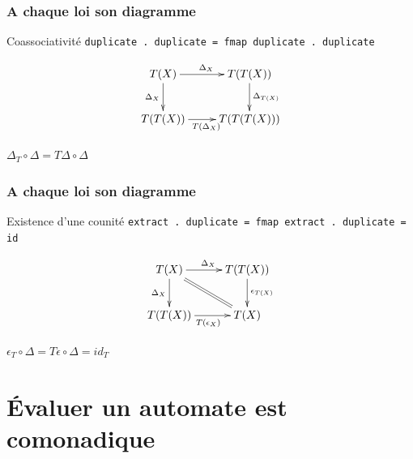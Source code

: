 \documentclass{beamer}
\begin{document}
\begin{frame}
\frametitle{A chaque loi son diagramme}
\begin{alertblock}{Coassociativité}
\verb!duplicate . duplicate = fmap duplicate . duplicate!
\end{alertblock}

\begin{block}{}

\[
\xymatrix{
T(X) \ar[r]^{\Delta_X} \ar[d]_{\Delta_X} & T(T(X)) \ar[d]^{\Delta_{T(X)}} \\
T(T(X)) \ar[r]_{T(\Delta_X)} & T(T(T(X))) \\
}
\]
\end{block}

\begin{block}{}
\begin{center}
$\Delta_T \circ \Delta = T\Delta \circ \Delta$
\end{center}
\end{block}

\end{frame}

\begin{frame}
\frametitle{A chaque loi son diagramme}
\begin{alertblock}{Existence d'une counité}
\verb!extract . duplicate = fmap extract . duplicate = id!
\end{alertblock}

\begin{block}{}
\[
\xymatrix{
T(X) \ar[d]_{\Delta_X} \ar[r]^{\Delta_X}  \ar@{=}[dr] & T(T(X))   \ar[d]^{\epsilon_{T(X)}} \\
T(T(X)) \ar[r]_{T(\epsilon_X)} & T(X) \\
}
\]
\end{block}

\begin{block}{}
\begin{center}
$\epsilon_T \circ \Delta = T \epsilon \circ \Delta = id_T$
\end{center}
\end{block}

\end{frame}

\section{Évaluer un automate est comonadique}
\end{document}
